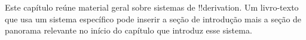 \documentclass[../../../include/open-logic-chapter]{subfiles}
\begin{document}
      {}
      {}

\begin{editorial}
Este capítulo reúne material geral sobre sistemas de !!{derivation}. Um
livro-texto que usa um sistema específico pode inserir a seção de
introdução mais a seção de panorama relevante no início do capítulo que
introduz esse sistema.
\end{editorial}






\OLEndChapterHook
\end{document}
